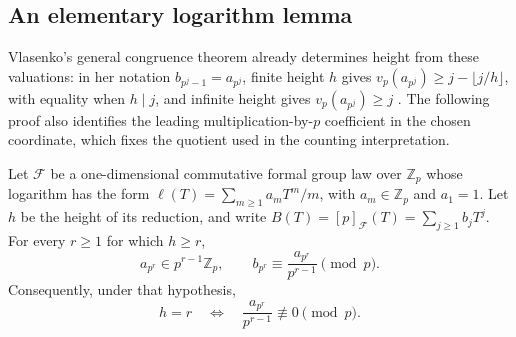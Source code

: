 \subsection{An elementary logarithm lemma}
Vlasenko's general congruence theorem already determines height from
these valuations: in her notation $b_{p^j-1}=a_{p^j}$, finite height
$h$ gives $v_p(a_{p^j})\ge j-\lfloor j/h\rfloor$, with equality when
$h\mid j$, and infinite height gives $v_p(a_{p^j})\ge j$
\citep[Theorem~2(i), arXiv version~5, p.~3]{Vlasenko2019}.
The following proof also identifies the leading multiplication-by-$p$
coefficient in the chosen coordinate, which fixes the quotient used
in the counting interpretation.
\begin{lemma}
\label{lem:logarithm-height}
Let $\mathcal F$ be a one-dimensional commutative formal group law over
$\mathbb Z_p$ whose logarithm has the form
$\ell(T)=\sum_{m\ge1}a_mT^m/m$, with $a_m\in\mathbb Z_p$ and $a_1=1$.
Let $h$ be the height of its reduction, and write
$B(T)=[p]_{\mathcal F}(T)=\sum_{j\ge1}b_jT^j$.
For every $r\ge1$ for which $h\ge r$,
\begin{equation}
 a_{p^r}\in p^{r-1}\mathbb Z_p,\qquad
 b_{p^r}\equiv\frac{a_{p^r}}{p^{r-1}}\pmod p.         \label{eq:H3}
\end{equation}
Consequently, under that hypothesis,
\begin{equation}
 h=r\quad\Longleftrightarrow\quad
 \frac{a_{p^r}}{p^{r-1}}\not\equiv0\pmod p.           \label{eq:H4}
\end{equation}
\end{lemma}
